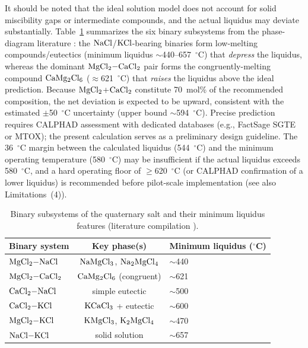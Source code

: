 \documentclass[sn-mathphys,Numbered]{sn-jnl}
\begin{document}
It should be noted that the ideal solution model does not account for solid miscibility gaps or intermediate compounds, and the actual liquidus may deviate substantially. Table~\ref{tab:binary} summarizes the six binary subsystems from the phase-diagram literature \cite{chartrand2000,plettcher1990}: the $\ce{NaCl}$/$\ce{KCl}$-bearing binaries form low-melting compounds/eutectics (minimum liquidus $\sim$440--657~$^{\circ}$C) that \emph{depress} the liquidus, whereas the dominant $\ce{MgCl2-CaCl2}$ pair forms the congruently-melting compound $\ce{CaMg2Cl6}$ ($\approx$621~$^{\circ}$C) that \emph{raises} the liquidus above the ideal prediction. Because $\ce{MgCl2}$+$\ce{CaCl2}$ constitute 70~mol\% of the recommended composition, the net deviation is expected to be upward, consistent with the estimated $\pm$50~$^{\circ}$C uncertainty (upper bound $\sim$594~$^{\circ}$C). Precise prediction requires CALPHAD assessment with dedicated databases (e.g., FactSage SGTE or MTOX); the present calculation serves as a preliminary design guideline. The 36~$^{\circ}$C margin between the calculated liquidus (544~$^{\circ}$C) and the minimum operating temperature (580~$^{\circ}$C) may be insufficient if the actual liquidus exceeds 580~$^{\circ}$C, and a hard operating floor of $\geq$620~$^{\circ}$C (or CALPHAD confirmation of a lower liquidus) is recommended before pilot-scale implementation (see also Limitations~(4)).

\begin{table}[!ht]
\centering
\footnotesize
\caption{Binary subsystems of the quaternary salt and their minimum liquidus features (literature compilation \cite{chartrand2000,plettcher1990}).}
\label{tab:binary}
\begin{tabular}{lcl}
\toprule
Binary system & Key phase(s) & Minimum liquidus ($^{\circ}$C) \\
\midrule
$\ce{MgCl2-NaCl}$ & $\ce{NaMgCl3}$, $\ce{Na2MgCl4}$ & $\sim$440 \\
$\ce{MgCl2-CaCl2}$ & $\ce{CaMg2Cl6}$ (congruent) & $\sim$621 \\
$\ce{CaCl2-NaCl}$ & simple eutectic & $\sim$500 \\
$\ce{CaCl2-KCl}$ & $\ce{KCaCl3}$ + eutectic & $\sim$600 \\
$\ce{MgCl2-KCl}$ & $\ce{KMgCl3}$, $\ce{K2MgCl4}$ & $\sim$470 \\
$\ce{NaCl-KCl}$ & solid solution & $\sim$657 \\
\bottomrule
\end{tabular}
\end{table}
\end{document}
